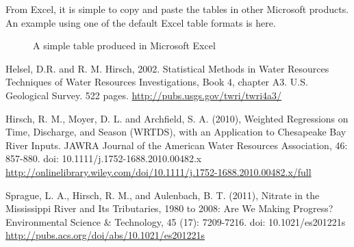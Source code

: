 \documentclass[a4paper,11pt]{article}\usepackage[]{graphicx}\usepackage[]{color}
\begin{document}
From Excel, it is simple to copy and paste the tables in other Microsoft products. An example using one of the default Excel table formats is here.

\begin{figure}[ht!]
\centering
\caption{A simple table produced in Microsoft Excel}
\label{overflow}
\end{figure}

\clearpage

\begin{thebibliography}{10}

Helsel, D.R. and R. M. Hirsch, 2002. Statistical Methods in Water Resources Techniques of Water Resources Investigations, Book 4, chapter A3. U.S. Geological Survey. 522 pages. \url{http://pubs.usgs.gov/twri/twri4a3/}

Hirsch, R. M., Moyer, D. L. and Archfield, S. A. (2010), Weighted Regressions on Time, Discharge, and Season (WRTDS), with an Application to Chesapeake Bay River Inputs. JAWRA Journal of the American Water Resources Association, 46: 857-880. doi: 10.1111/j.1752-1688.2010.00482.x \url{http://onlinelibrary.wiley.com/doi/10.1111/j.1752-1688.2010.00482.x/full}

Sprague, L. A., Hirsch, R. M., and Aulenbach, B. T. (2011), Nitrate in the Mississippi River and Its Tributaries, 1980 to 2008: Are We Making Progress? Environmental Science \& Technology, 45 (17): 7209-7216. doi: 10.1021/es201221s \url{http://pubs.acs.org/doi/abs/10.1021/es201221s}

\end{thebibliography}
\end{document}
